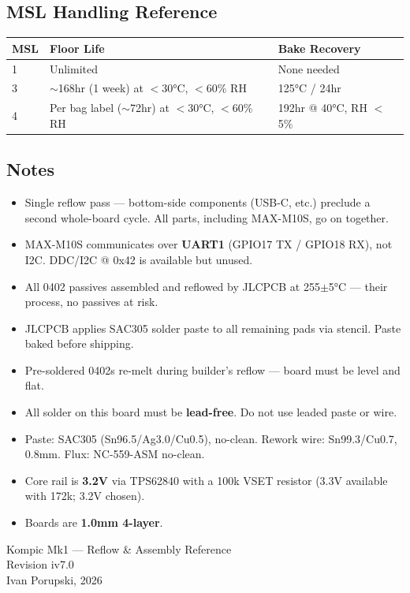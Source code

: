 \documentclass[11pt,a4paper]{article}
\begin{document}
\subsection*{MSL Handling Reference}

\begin{table}[H]
\centering
\begin{tabular}{@{}lll@{}}
\toprule
\textbf{MSL} & \textbf{Floor Life} & \textbf{Bake Recovery} \\
\midrule
1 & Unlimited & None needed \\
3 & $\sim$168hr (1 week) at $<$30°C, $<$60\% RH & 125°C / 24hr \\
4 & Per bag label ($\sim$72hr) at $<$30°C, $<$60\% RH & 192hr @ 40°C, RH $<$5\% \\
\bottomrule
\end{tabular}
\end{table}

\vfill

\subsection*{Notes}
\begin{itemize}[nosep]
\item Single reflow pass — bottom-side components (USB-C, etc.) preclude a second whole-board cycle. All parts, including MAX-M10S, go on together.
\item MAX-M10S communicates over \textbf{UART1} (GPIO17 TX / GPIO18 RX), not I2C. DDC/I2C @ 0x42 is available but unused.
\item All 0402 passives assembled and reflowed by JLCPCB at 255$\pm$5°C — their process, no passives at risk.
\item JLCPCB applies SAC305 solder paste to all remaining pads via stencil. Paste baked before shipping.
\item Pre-soldered 0402s re-melt during builder's reflow — board must be level and flat.
\item All solder on this board must be \textbf{lead-free}. Do not use leaded paste or wire.
\item Paste: SAC305 (Sn96.5/Ag3.0/Cu0.5), no-clean. Rework wire: Sn99.3/Cu0.7, 0.8mm. Flux: NC-559-ASM no-clean.
\item Core rail is \textbf{3.2V} via TPS62840 with a 100k VSET resistor (3.3V available with 172k; 3.2V chosen).
\item Boards are \textbf{1.0mm 4-layer}.
\end{itemize}

\vfill
\begin{center}\footnotesize
Kompic Mk1 — Reflow \& Assembly Reference \\
Revision iv7.0 \\
Ivan Porupski, 2026
\end{center}
\end{document}
